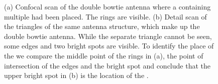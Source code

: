 			\begin{figure}[htp]
				\begin{subfigure}[t]{ 0.49\linewidth}
					\centering
					\caption{}
					\label{subfig::antenna_laser_scan}
				\end{subfigure}
				\hfill
				\begin{subfigure}[t]{ 0.49\linewidth}
					\centering
					\caption{}
					\label{subfig::antenna_bowtie_laser_scan}
				\end{subfigure}
				\caption[Confocal scan of a gold double bowtie antenna]{(a) Confocal scan of the double bowtie antenna where a \nd containing multiple \sivs had been placed. The rings are visible. (b) Detail scan of the triangles of the same antenna structure, which make up the double bowtie antenna. While the separate triangle cannot be seen, some edges and two bright spots are visible. To identify the place of the \nd we compare the middle point of the rings in (a), the point of intersection of the edges and the bright spot and conclude that the upper bright spot in (b) is the location of the \nd. }
			\end{figure}

